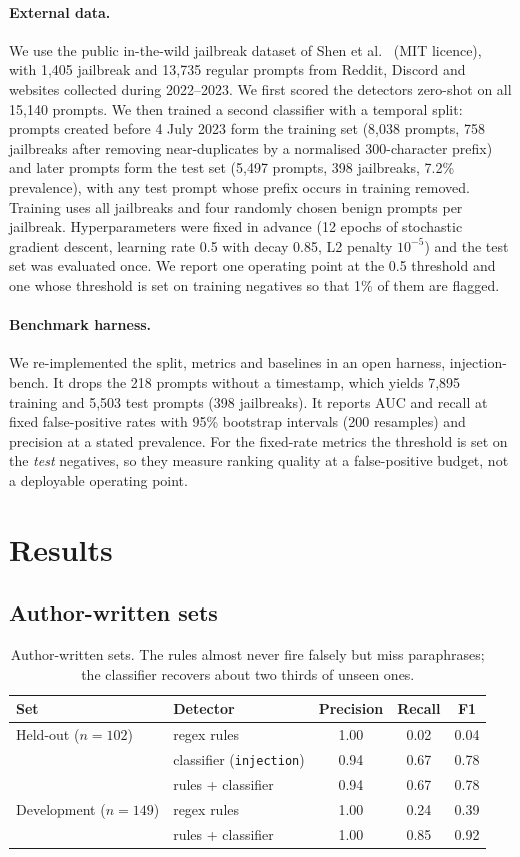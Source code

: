 \documentclass[11pt]{article}
\begin{document}
\paragraph{External data.} We use the public in-the-wild jailbreak dataset of Shen et al.~\cite{shen2024dan} (MIT licence), with 1,405 jailbreak and 13,735 regular prompts from Reddit, Discord and websites collected during 2022--2023. We first scored the detectors zero-shot on all 15,140 prompts. We then trained a second classifier with a temporal split: prompts created before 4 July 2023 form the training set (8,038 prompts, 758 jailbreaks after removing near-duplicates by a normalised 300-character prefix) and later prompts form the test set (5,497 prompts, 398 jailbreaks, 7.2\% prevalence), with any test prompt whose prefix occurs in training removed. Training uses all jailbreaks and four randomly chosen benign prompts per jailbreak. Hyperparameters were fixed in advance (12 epochs of stochastic gradient descent, learning rate 0.5 with decay 0.85, L2 penalty $10^{-5}$) and the test set was evaluated once. We report one operating point at the 0.5 threshold and one whose threshold is set on training negatives so that 1\% of them are flagged.

\paragraph{Benchmark harness.} We re-implemented the split, metrics and baselines in an open harness, injection-bench. It drops the 218 prompts without a timestamp, which yields 7,895 training and 5,503 test prompts (398 jailbreaks). It reports AUC and recall at fixed false-positive rates with 95\% bootstrap intervals (200 resamples) and precision at a stated prevalence. For the fixed-rate metrics the threshold is set on the \emph{test} negatives, so they measure ranking quality at a false-positive budget, not a deployable operating point.

\section{Results}
\subsection{Author-written sets}
\begin{table}[h]\centering\small
\begin{tabular}{llccc}\toprule
Set & Detector & Precision & Recall & F1\\\midrule
Held-out ($n{=}102$) & regex rules & 1.00 & 0.02 & 0.04\\
 & classifier (\texttt{injection}) & 0.94 & 0.67 & 0.78\\
 & rules + classifier & 0.94 & 0.67 & 0.78\\\midrule
Development ($n{=}149$) & regex rules & 1.00 & 0.24 & 0.39\\
 & rules + classifier & 1.00 & 0.85 & 0.92\\\bottomrule
\end{tabular}
\caption{Author-written sets. The rules almost never fire falsely but miss paraphrases; the classifier recovers about two thirds of unseen ones.}
\end{table}
\end{document}
